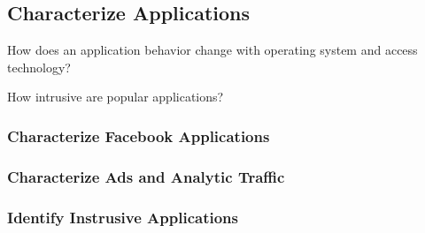 \subsection{Characterize Applications}
\label{sec:characterize-app}

\begin{packedenumerate}
\item How does an application behavior change with operating system and access technology?
\item How intrusive are popular applications?
\end{packedenumerate}

\subsubsection{Characterize Facebook Applications}

\subsubsection{Characterize Ads and Analytic Traffic}

\subsubsection{Identify Instrusive Applications}


